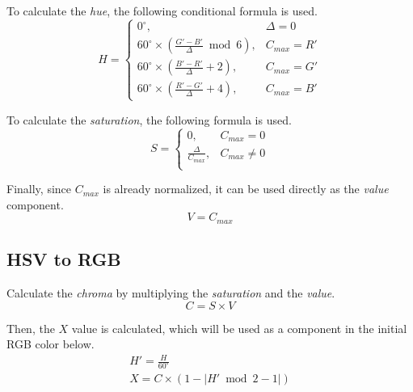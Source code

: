 \documentclass{amsart}
\begin{document}
To calculate the \textit{hue}, the following conditional formula is used.
\begin{equation*}
  H =
  \begin{cases}
    0^\circ,                                                    & \Delta = 0 \\
    60^\circ \times \left(\frac{G'-B'}{\Delta} \bmod 6 \right), & C_{max} = R' \\
    60^\circ \times \left(\frac{B'-R'}{\Delta} + 2 \right),     & C_{max} = G' \\
    60^\circ \times \left(\frac{R'-G'}{\Delta} + 4 \right),     & C_{max} = B'
  \end{cases}
\end{equation*}

To calculate the \textit{saturation}, the following formula is used.
\begin{equation*}
  S =
  \begin{cases}
    0,                      & C_{max} = 0 \\
    \frac{\Delta}{C_{max}}, & C_{max} \neq 0 \\
  \end{cases}
\end{equation*}

Finally, since $C_{max}$ is already normalized, it can be used directly as the
\textit{value} component.
\begin{equation*}
  V = C_{max}
\end{equation*}

\subsection{HSV to RGB}

Calculate the \textit{chroma} by multiplying the \textit{saturation} and the
\textit{value}.
\begin{equation*}
  C = S \times V
\end{equation*}

Then, the $X$ value is calculated, which will be used as a component in the
initial RGB color below.
\begin{gather*}
  H' = \frac{H}{60^\circ} \\
  X = C \times \left( 1 - \left| H' \bmod 2 - 1 \right| \right)
\end{gather*}
\end{document}
